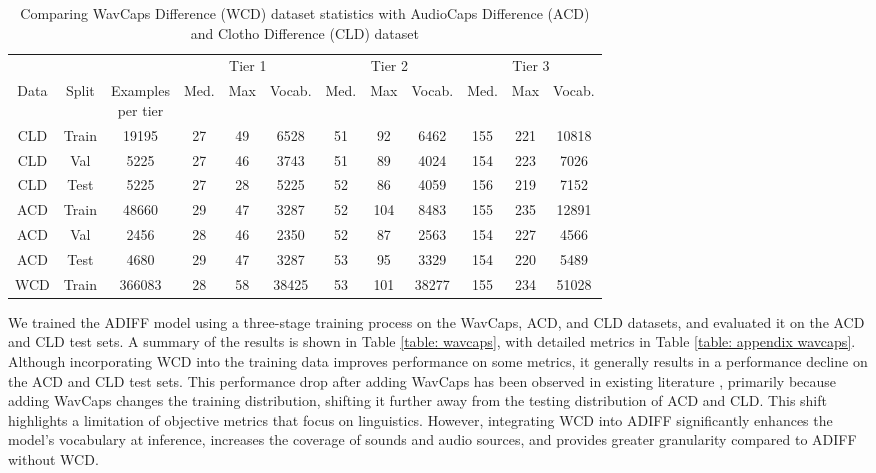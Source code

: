 \begin{table}[!ht]
\scriptsize
\center
\begin{tabular}{c|c|c|ccc|ccc|ccc} \toprule
 & & & \multicolumn{3}{c|}{Tier 1} & \multicolumn{3}{c|}{Tier 2} & \multicolumn{3}{c}{Tier 3} \\
Data & Split & \makecell{Examples\\per tier} & Med. & Max & Vocab. & Med. & Max & Vocab. & Med. & Max & Vocab. \\
\midrule
CLD & Train & 19195 & 27 & 49 & 6528 & 51 & 92 & 6462 & 155 & 221 & 10818\\
CLD & Val & 5225 & 27 & 46 & 3743 & 51 & 89 & 4024 & 154 & 223 & 7026\\
CLD & Test & 5225 & 27 & 28 & 5225 & 52 & 86 & 4059 & 156 & 219 & 7152\\ \midrule
ACD & Train & 48660 & 29 & 47 & 3287 & 52 & 104 & 8483 & 155 & 235 & 12891\\
ACD & Val & 2456 & 28 & 46 & 2350  & 52 & 87 & 2563 & 154 & 227 & 4566\\ 
ACD & Test & 4680 & 29 & 47 & 3287 & 53 & 95 & 3329 & 154 & 220 & 5489 \\ \midrule
WCD & Train & 366083 & 28 & 58 & 38425 & 53 & 101 & 38277 & 155 & 234 & 51028 \\
\bottomrule
\end{tabular}
\caption{\small Comparing WavCaps Difference (WCD) dataset statistics with AudioCaps Difference (ACD) and Clotho Difference (CLD) dataset} \label{table: wavcaps difference data stats} \vspace{-0.1in}
\end{table}

We trained the ADIFF model using a three-stage training process on the WavCaps, ACD, and CLD datasets, and evaluated it on the ACD and CLD test sets. A summary of the results is shown in Table \ref{table: wavcaps}, with detailed metrics in Table \ref{table: appendix wavcaps}. Although incorporating WCD into the training data improves performance on some metrics, it generally results in a performance decline on the ACD and CLD test sets. This performance drop after adding WavCaps has been observed in existing literature \cite{wavcaps, mspengi, noaudiocap}, primarily because adding WavCaps changes the training distribution, shifting it further away from the testing distribution of ACD and CLD. This shift highlights a limitation of objective metrics that focus on linguistics. However, integrating WCD into ADIFF significantly enhances the model's vocabulary at inference, increases the coverage of sounds and audio sources, and provides greater granularity compared to ADIFF without WCD.

